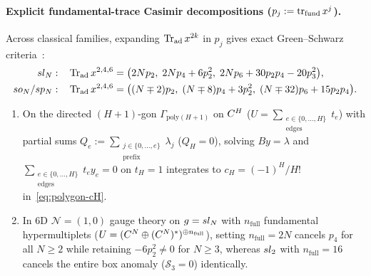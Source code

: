 \paragraph{Explicit fundamental-trace Casimir decompositions ($p_j := \operatorname{tr}_{\mathrm{fund}}x^j$).}
Across classical families, expanding $\operatorname{Tr}_{\mathrm{ad}}x^{2k}$ in $p_j$ gives exact Green--Schwarz criteria~\cite{Repo9e833c8}:
\begin{equation}
\label{eq:classical-casimir-traces}
\begin{aligned}
sl_N:\quad &\operatorname{Tr}_{\mathrm{ad}}x^{2,4,6} = \bigl(2N p_2,\; 2N p_4 + 6p_2^2,\; 2N p_6 + 30p_2 p_4 - 20p_3^2\bigr),\\
so_N / sp_N:\quad &\operatorname{Tr}_{\mathrm{ad}}x^{2,4,6} = \bigl((N\mp 2)p_2,\; (N\mp 8)p_4 + 3p_2^2,\; (N\mp 32)p_6 + 15p_2 p_4\bigr).
\end{aligned}
\end{equation}

\begin{lemma}[{Evaluation of the $(H+1)$-gon simplex kernel $c_H = (-1)^H/H!$ and $6\mathrm{D}$ $\mathcal{N}=(1,0)$ box cancellation}]
\label{lem:polygon-cH-and-6d}
\leavevmode
\begin{enumerate}[label=(\arabic*),leftmargin=*]
  \item On the directed $(H+1)$-gon $\Gamma_{\mathrm{poly}(H+1)}$ on $C^H$ ($U = \sum_{\substack{e\in\{0,\dots,H\}\\\mathrm{edges}}}t_e$) with partial sums $Q_e := \sum_{\substack{j\in\{0,\dots,e\}\\\mathrm{prefix}}}\lambda_j$ ($Q_H = 0$), solving $B y = \lambda$ and $\sum_{\substack{e\in\{0,\dots,H\}\\\mathrm{edges}}}t_e y_e = 0$ on $t_H = 1$ integrates to $c_H = (-1)^H/H!$ in~\eqref{eq:polygon-cH}.

  \item In $6\mathrm{D}$ $\mathcal{N}=(1,0)$ gauge theory on $g = sl_N$ with $n_{\mathrm{full}}$ fundamental hypermultiplets ($U = (C^N\oplus(C^N)^*)^{\oplus n_{\mathrm{full}}}$), setting $n_{\mathrm{full}} = 2N$ cancels $p_4$ for all $N \ge 2$ while retaining $-6p_2^2 \neq 0$ for $N \ge 3$, whereas $sl_2$ with $n_{\mathrm{full}} = 16$ cancels the entire box anomaly ($\mathcal{S}_3 = 0$) identically.
\end{enumerate}
\end{lemma}

